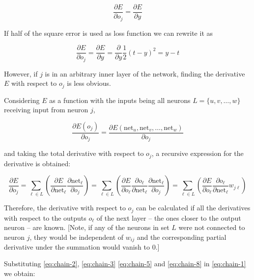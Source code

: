 \begin{equation}
    \label{eq:chain-5}
    {\frac {\partial E}{\partial o_{j}}}={\frac {\partial E}{\partial y}}
\end{equation}

If half of the square error is used as loss function we can rewrite it as

\begin{equation}
    \label{eq:chain-6}
    {\frac {\partial E}{\partial o_{j}}}={\frac {\partial E}{\partial y}}={\frac {\partial }{\partial y}}{\frac {1}{2}}(t-y)^{2}=y-t
\end{equation}

However, if $j$ is in an arbitrary inner layer of the network, finding the derivative $E$ with respect to $o_{j}$ is less obvious.

Considering $E$ as a function with the inputs being all neurons $L=\{u,v,\dots ,w\}$ receiving input from neuron $j$,

\begin{equation}
    \label{eq:chain-7}
    {\frac {\partial E(o_{j})}{\partial o_{j}}}={\frac {\partial E(\mathrm {net} _{u},{\text{net}}_{v},\dots ,\mathrm {net} _{w})}{\partial o_{j}}}
\end{equation}

and taking the total derivative with respect to $o_j$, a recursive expression for the derivative is obtained:

\begin{equation}
    \label{eq:chain-8}
    {\frac {\partial E}{\partial o_{j}}}=\sum _{\ell \in L}\left({\frac {\partial E}{\partial {\text{net}}_{\ell }}}{\frac {\partial {\text{net}}_{\ell }}{\partial o_{j}}}\right)=\sum _{\ell \in L}\left({\frac {\partial E}{\partial o_{\ell }}}{\frac {\partial o_{\ell }}{\partial {\text{net}}_{\ell }}}{\frac {\partial {\text{net}}_{\ell }}{\partial o_{j}}}\right)=\sum _{\ell \in L}\left({\frac {\partial E}{\partial o_{\ell }}}{\frac {\partial o_{\ell }}{\partial {\text{net}}_{\ell }}}w_{j\ell }\right)
\end{equation}

Therefore, the derivative with respect to $o_j$ can be calculated if all the derivatives with respect to the outputs $o_{\ell }$ of the next layer – the ones closer to the output neuron – are known. [Note, if any of the neurons in set $L$ were not connected to neuron $j$, they would be independent of $w_{ij}$ and the corresponding partial derivative under the summation would vanish to 0.]

Substituting \ref{eq:chain-2}, \ref{eq:chain-3} \ref{eq:chain-5} and \ref{eq:chain-8} in \ref{eq:chain-1} we obtain:

